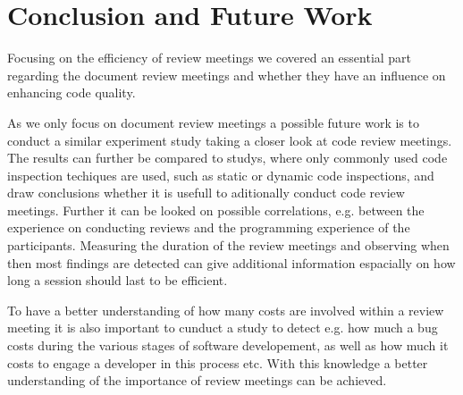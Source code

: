 \section{Conclusion and Future Work}

Focusing on the efficiency of review meetings we covered an essential part regarding the document review meetings and whether they have an influence on enhancing code quality.  


As we only focus on document review meetings a possible future work is to conduct a similar experiment study taking a closer look at code review meetings. The results can further be compared to studys, where only commonly used code inspection techiques are used, such as static or dynamic code inspections, and draw conclusions whether it is usefull to aditionally conduct code review meetings. Further it can be looked on possible correlations, e.g. between the experience on conducting reviews and the programming experience of the participants. Measuring the duration of the review meetings and observing when then most findings are detected can give additional information espacially on how long a session should last to be efficient.  


To have a better understanding of how many costs are involved within a review meeting it is also important to cunduct a study to detect e.g. how much a bug costs during the various stages of software developement, as well as how much it costs to engage a developer in this process etc. With this knowledge a better understanding of the importance of review meetings can be achieved.     